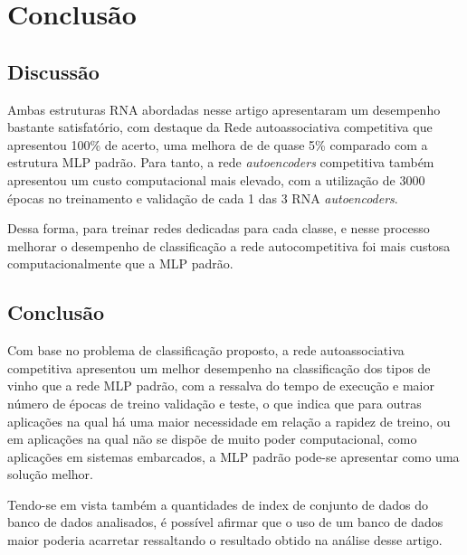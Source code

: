 \section{Conclusão}

\subsection{Discussão}

Ambas estruturas RNA abordadas nesse artigo apresentaram um desempenho bastante satisfatório, com destaque da Rede autoassociativa competitiva que apresentou 100\% de acerto, uma melhora de de quase 5\% comparado com a estrutura MLP padrão. Para tanto, a rede \textit{autoencoders}  competitiva também apresentou um custo computacional mais elevado, com a utilização de 3000 épocas no treinamento e validação de cada 1 das 3 RNA \textit{autoencoders}.

Dessa forma, para treinar redes dedicadas para cada classe, e nesse processo melhorar o desempenho de classificação a rede autocompetitiva foi mais custosa computacionalmente que a MLP padrão.


\subsection{Conclusão}

Com base no problema de classificação proposto, a rede autoassociativa competitiva apresentou um melhor desempenho na classificação dos tipos de vinho que a rede MLP padrão, com a ressalva do tempo de execução e maior número de épocas de treino validação e teste, o que indica que para outras aplicações na qual há uma maior necessidade em relação a rapidez de treino, ou em aplicações na qual não se dispõe de muito poder computacional, como aplicações em sistemas embarcados, a MLP padrão pode-se apresentar como uma solução melhor.

Tendo-se em vista também a quantidades de index de conjunto de dados do banco de dados analisados, é possível afirmar que o uso de um banco de dados maior poderia acarretar ressaltando o resultado obtido na análise desse artigo.
